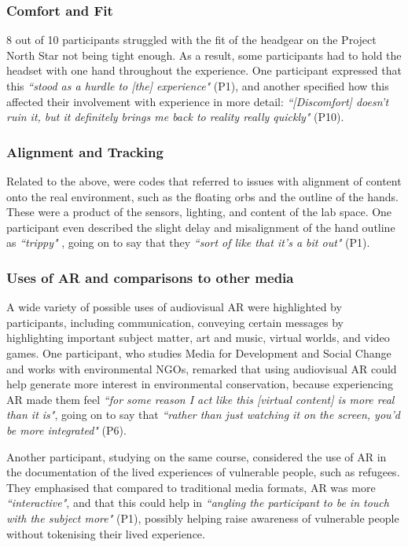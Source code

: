 \subsubsection{Comfort and Fit}\label{sec: polaris-feedback-adoption-comfort}
8 out of 10 participants struggled with the fit of the headgear on the Project North Star not being tight enough. As a result, some participants had to hold the headset with one hand throughout the experience. One participant expressed that this \textit{``stood as a hurdle to [the] experience"} (P1), and another specified how this affected their involvement with experience in more detail: \textit{``[Discomfort] doesn’t ruin it, but it definitely brings me back to reality really quickly"} (P10).
\subsubsection{Alignment and Tracking}\label{sec: polaris-feedback-adoption-alignment}
Related to the above, were codes that referred to issues with alignment of content onto the real environment, such as the floating orbs and the outline of the hands. These were a product of the sensors, lighting, and content of the lab space. One participant even described the slight delay and misalignment of the hand outline as \textit{``trippy"} , going on to say that they \textit{``sort of like that it’s a bit out"} (P1).

\subsubsection{Uses of AR and comparisons to other media}\label{sec: polaris-feedback-adoption-uses}
A wide variety of possible uses of audiovisual AR were highlighted by participants, including communication, conveying certain messages by highlighting important subject matter, art and music, virtual worlds, and video games.
One participant, who studies Media for Development and Social Change and works with environmental NGOs, remarked that using audiovisual AR could help generate more interest in environmental conservation, because experiencing AR made them feel \textit{``for some reason I act like this [virtual content] is more real than it is"}, going on to say that \textit{``rather than just watching it on the screen, you’d be more integrated"} (P6).

Another participant, studying on the same course, considered the use of AR in the documentation of the lived experiences of vulnerable people, such as refugees. They emphasised that compared to traditional media formats, AR was more \textit{``interactive"}, and that this could help in \textit{``angling the participant to be in touch with the subject more"} (P1), possibly helping raise awareness of vulnerable people without tokenising their lived experience.

